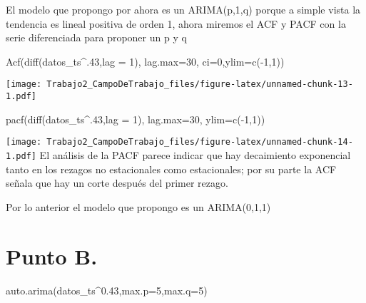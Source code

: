 \documentclass[
]{article}
\newenvironment{Shaded}{\begin{snugshade}}{\end{snugshade}}
\newcommand{\AttributeTok}[1]{\textcolor[rgb]{0.77,0.63,0.00}{#1}}
\newcommand{\DecValTok}[1]{\textcolor[rgb]{0.00,0.00,0.81}{#1}}
\newcommand{\FloatTok}[1]{\textcolor[rgb]{0.00,0.00,0.81}{#1}}
\newcommand{\FunctionTok}[1]{\textcolor[rgb]{0.00,0.00,0.00}{#1}}
\newcommand{\NormalTok}[1]{#1}
\newcommand{\SpecialCharTok}[1]{\textcolor[rgb]{0.00,0.00,0.00}{#1}}
\begin{document}
El modelo que propongo por ahora es un ARIMA(p,1,q) porque a simple
vista la tendencia es lineal positiva de orden 1, ahora miremos el ACF y
PACF con la serie diferenciada para proponer un p y q

\begin{Shaded}
\begin{Highlighting}[]
\FunctionTok{Acf}\NormalTok{(}\FunctionTok{diff}\NormalTok{(datos\_ts}\SpecialCharTok{\^{}}\NormalTok{.}\DecValTok{43}\NormalTok{,}\AttributeTok{lag =} \DecValTok{1}\NormalTok{), }\AttributeTok{lag.max=}\DecValTok{30}\NormalTok{, }\AttributeTok{ci=}\DecValTok{0}\NormalTok{,}\AttributeTok{ylim=}\FunctionTok{c}\NormalTok{(}\SpecialCharTok{{-}}\DecValTok{1}\NormalTok{,}\DecValTok{1}\NormalTok{))}
\end{Highlighting}
\end{Shaded}

\texttt{[image: Trabajo2\_CampoDeTrabajo\_files/figure-latex/unnamed-chunk-13-1.pdf]}

\begin{Shaded}
\begin{Highlighting}[]
\FunctionTok{pacf}\NormalTok{(}\FunctionTok{diff}\NormalTok{(datos\_ts}\SpecialCharTok{\^{}}\NormalTok{.}\DecValTok{43}\NormalTok{,}\AttributeTok{lag =} \DecValTok{1}\NormalTok{), }\AttributeTok{lag.max=}\DecValTok{30}\NormalTok{, }\AttributeTok{ylim=}\FunctionTok{c}\NormalTok{(}\SpecialCharTok{{-}}\DecValTok{1}\NormalTok{,}\DecValTok{1}\NormalTok{))}
\end{Highlighting}
\end{Shaded}

\texttt{[image: Trabajo2\_CampoDeTrabajo\_files/figure-latex/unnamed-chunk-14-1.pdf]}
El análisis de la PACF parece indicar que hay decaimiento exponencial
tanto en los rezagos no estacionales como estacionales; por su parte la
ACF señala que hay un corte después del primer rezago.

Por lo anterior el modelo que propongo es un ARIMA(0,1,1)

\hypertarget{punto-b.}{%
\section{Punto B.}\label{punto-b.}}

\begin{Shaded}
\begin{Highlighting}[]
\FunctionTok{auto.arima}\NormalTok{(datos\_ts}\SpecialCharTok{\^{}}\FloatTok{0.43}\NormalTok{,}\AttributeTok{max.p=}\DecValTok{5}\NormalTok{,}\AttributeTok{max.q=}\DecValTok{5}\NormalTok{)}
\end{Highlighting}
\end{Shaded}
\end{document}
